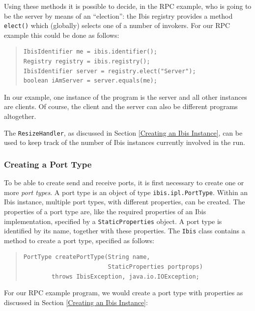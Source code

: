 \documentclass[10pt]{article}
\begin{document}
Using these methods it is possible to decide, in the RPC example,
who is going to be the server by means of an ``election'': the Ibis
registry provides a method \texttt{elect()} which (globally) selects
one of a number of invokers.  For our RPC example this could be done as
follows:

{\small
\begin{quote}
\begin{verbatim}
IbisIdentifier me = ibis.identifier();
Registry registry = ibis.registry();
IbisIdentifier server = registry.elect("Server");
boolean iAmServer = server.equals(me);
\end{verbatim}
\end{quote}
}

In our example, one instance of the program is the server and all
other instances are clients.  Of course, the client and the server can also
be different programs altogether.

The \texttt{ResizeHandler}, as discussed in Section
\ref{Creating an Ibis Instance}, can be used to keep track of the number
of Ibis instances currently involved in the run.

\subsubsection{Creating a Port Type}

To be able to create send and receive ports, it is first necessary
to create one or more \emph{port types}.
A port type is an object
of type \texttt{ibis.ipl.PortType}.
Within an Ibis instance,
multiple port types, with different properties, can be created.
The properties of a port type are, like the required properties
of an Ibis implementation, specified by a \texttt{StaticProperties} object.
A port type is identified by its name, together with these properties.
The \texttt{Ibis} class contains a method to create a port type,
specified as follows:
{\small
\begin{quote}
\begin{verbatim}
PortType createPortType(String name,
                        StaticProperties portprops)
        throws IbisException, java.io.IOException;
\end{verbatim}
\end{quote}
}

\noindent
For our RPC example program, we would create a port type with properties
as discussed in Section \ref{Creating an Ibis Instance}:
\end{document}
